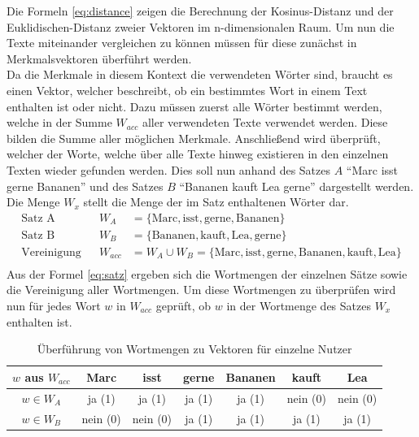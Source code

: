 Die Formeln \eqref{eq:distance} zeigen die Berechnung der Kosinus-Distanz und der Euklidischen-Distanz zweier Vektoren im n-dimensionalen Raum. Um nun die Texte miteinander vergleichen zu können müssen für diese zunächst in Merkmalsvektoren überführt werden. \\ \newline
Da die Merkmale in diesem Kontext die verwendeten Wörter sind, braucht es einen Vektor, welcher beschreibt, ob ein bestimmtes Wort in einem Text enthalten ist oder nicht. Dazu müssen zuerst alle Wörter bestimmt werden, welche in der Summe $W_{acc}$ aller verwendeten Texte verwendet werden. Diese bilden die Summe aller möglichen Merkmale. Anschließend wird überprüft, welcher der Worte, welche über alle Texte hinweg existieren in den einzelnen Texten wieder gefunden werden. Dies soll nun anhand des Satzes $A$ "`Marc isst gerne Bananen"' und des Satzes $B$ "`Bananen kauft Lea gerne"' dargestellt werden. Die Menge $W_{x}$ stellt die Menge der im Satz enthaltenen Wörter dar. 
\begin{equation}
	\begin{aligned} 
		\text{Satz A}&& W_{A}&=\{\text{Marc},\text{isst},\text{gerne},\text{Bananen}\}  \\
		\text{Satz B}&& W_{B}&=\{\text{Bananen},\text{kauft},\text{Lea},\text{gerne}\}  \\
		\text{Vereinigung}&& W_{acc} &= W_{A}\cup W_{B} = \{\text{Marc},\text{isst},\text{gerne},\text{Bananen},\text{kauft},\text{Lea}\}  \\
	\end{aligned} 
	\label{eq:satz}
\end{equation}
Aus der Formel \eqref{eq:satz} ergeben sich die Wortmengen der einzelnen Sätze sowie die Vereinigung aller Wortmengen. Um diese Wortmengen zu überprüfen wird nun für jedes Wort $w$ in $W_{acc}$ geprüft, ob $w$ in der Wortmenge des Satzes $W_{x}$ enthalten ist. 


\begin{center}
	\begin{table}
	\begin{tabular}{c | c | c | c | c | c | c}
		
		$w$ aus $W_{acc}$ & Marc 	& isst 		& gerne 	& Bananen 	& kauft 	& Lea		\\
		\hline
		\hline
		$w\in {W}_{A}$ 	  & ja (1)	& ja (1)	& ja (1)	& ja (1)	& nein (0)	& nein (0)	\\
		\hline
		$w\in {W}_{B}$ 	  & nein (0)& nein (0)	& ja (1)	& ja (1)	& ja (1)	& ja (1)

	\end{tabular}
		\caption{Überführung von Wortmengen zu Vektoren für einzelne Nutzer}
	\end{table}
\end{center}

